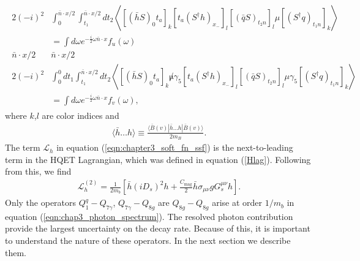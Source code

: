 \begin{eqnarray}
\begin{aligned}
2(-i)^{2} & \int_{0}^{\bar{n} \cdot x / 2} \int_{t_{1}}^{\bar{n} \cdot x / 2} d t_{2}\left\langle\left[(\bar{h} S)_{0} t_{a}\right]_{k}\left[t_{a}\left(S^{\dagger} h\right)_{x_{-}}\right]_{l}\left[(\bar{q} S)_{t_{2} n}\right]_{l} \mu\left[\left(S^{\dagger} q\right)_{t_{1} n}\right]_{k}\right\rangle \\
&=\int d \omega e^{-\frac{i}{2} \omega \bar{n} \cdot x} f_{u}(\omega) \\
\bar{n} \cdot x / 2 & \bar{n} \cdot x / 2 \\
2(-i)^{2} & \int_{0}^{0} d t_{1} \int_{t_{1}}^{\bar{n} \cdot x / 2} d t_{2}\left\langle\left[(\bar{h} S)_{0} t_{a}\right]_{k} \not \mu \gamma_{5}\left[t_{a}\left(S^{\dagger} h\right)_{x_{-}}\right]_{l}\left[(\bar{q} S)_{t_{2} n}\right]_{l} \mu \gamma_{5}\left[\left(S^{\dagger} q\right)_{t_{1} n}\right]_{k}\right\rangle \\
&=\int d \omega e^{-\frac{i}{2} \omega \bar{n} \cdot x} f_{v}(\omega),
\end{aligned}
\end{eqnarray}
where $k$,$l$ are color indices and 
\begin{eqnarray}
\langle\bar{h} \ldots h\rangle \equiv \frac{\langle\bar{B}(v)|\bar{h} \ldots h| \bar{B}(v)\rangle}{2 m_{B}}.
\end{eqnarray}
The term $\mathcal{L}_h$ in equation (\ref{eqn:chapter3_soft_fn_ssf}) is the next-to-leading term in the HQET Lagrangian, which was defined in equation (\ref{Hlag}). Following from this, we find 
\begin{eqnarray}
\mathcal{L}_{h}^{(2)}=\frac{1}{2 m_{b}}\left[\bar{h}\left(i D_{s}\right)^{2} h+\frac{C_{\operatorname{mag}}}{2} \bar{h} \sigma_{\mu \nu} g G_{s}^{\mu \nu} h\right].
\end{eqnarray}
Only the operators $Q_{1}^q-Q_{7\gamma}$, $Q_{7\gamma}-Q_{8g}$ are $Q_{8g}-Q_{8g}$ arise at order $1/m_b$ in equation (\ref{eqn:chap3_photon_spectrum}). The resolved photon contribution provide the largest uncertainty on the decay rate. Because of this, it is important to understand the nature of these operators. In the next section we describe them. 
